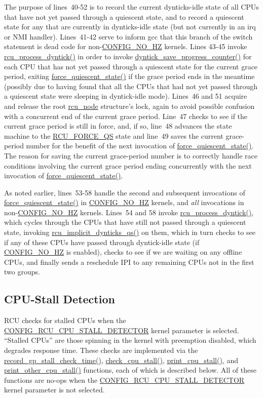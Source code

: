The purpose of lines~40-52 is to record the current dynticks-idle state
of all CPUs that have not yet passed through a quiescent state, and
to record a quiescent state for any that are currently in dynticks-idle
state (but not currently in an irq or NMI handler).
Lines~41-42 serve to inform gcc that this branch of the switch statement
is dead code for non-\url{CONFIG_NO_HZ} kernels.
Lines 43-45 invoke \url{rcu_process_dyntick()} in order to invoke
\url{dyntick_save_progress_counter()} for each CPU that has not yet
passed through a quiescent state for the current grace period,
exiting \url{force_quiescent_state()} if the grace period ends in
the meantime (possibly due to having found that all the CPUs that
had not yet passed through a quiescent state were sleeping in
dyntick-idle mode).
Lines~46 and 51 acquire and release the root \url{rcu_node} structure's
lock, again to avoid possible confusion with a concurrent end of the
current grace period.
Line~47 checks to see if the current grace period is still in force, and,
if so, line~48 advances the state machine to the \url{RCU_FORCE_QS} state
and line~49 saves the current grace-period number for the benefit of
the next invocation of \url{force_quiescent_state()}.
The reason for saving the current grace-period number is to correctly
handle race conditions involving the current grace period ending
concurrently with the next invocation of \url{force_quiescent_state()}.

As noted earlier, lines~53-58 handle the second and subsequent invocations
of \url{force_quiescent_state()} in \url{CONFIG_NO_HZ} kernels, and \emph{all}
invocations in non-\url{CONFIG_NO_HZ} kernels.
Lines~54 and 58 invoke \url{rcu_process_dyntick()}, which cycles through
the CPUs that have still not passed through a quiescent state, invoking
\url{rcu_implicit_dynticks_qs()} on them, which in turn checks to see
if any of these CPUs have passed through dyntick-idle state (if
\url{CONFIG_NO_HZ} is enabled), checks to see if we are waiting on
any offline CPUs, and finally sends a reschedule IPI to any remaining
CPUs not in the first two groups.

\subsection{CPU-Stall Detection}
\label{app:rcuimpl:rcutreewt:CPU-Stall Detection}

RCU checks for stalled CPUs when the \url{CONFIG_RCU_CPU_STALL_DETECTOR}
kernel parameter is selected.
``Stalled CPUs'' are those spinning in the kernel with preemption disabled,
which degrades response time.
These checks are implemented via the \url{record_gp_stall_check_time()},
\url{check_cpu_stall()}, \url{print_cpu_stall()}, and
\url{print_other_cpu_stall()} functions, each of which is described
below.
All of these functions are no-ops when the \url{CONFIG_RCU_CPU_STALL_DETECTOR}
kernel parameter is not selected.

